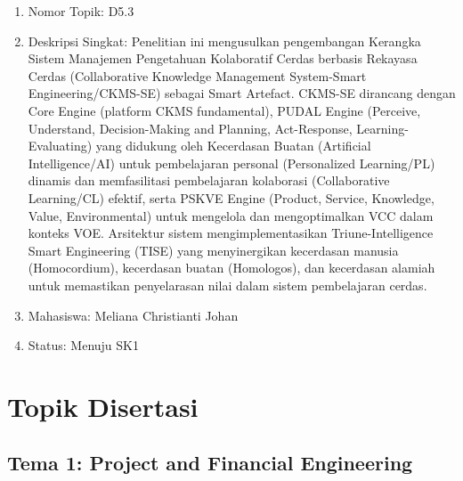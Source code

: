 \documentclass[
  letterpaper,
  DIV=11,
  numbers=noendperiod]{scrreprt}
\providecommand{\tightlist}{%
  \setlength{\itemsep}{0pt}\setlength{\parskip}{0pt}}
\begin{document}
\begin{enumerate}
  \begin{enumerate}
  \def\labelenumii{\arabic{enumii}.}
  \tightlist
  \item
    Nomor Topik: D5.3
  \item
    Deskripsi Singkat: Penelitian ini mengusulkan pengembangan Kerangka
    Sistem Manajemen Pengetahuan Kolaboratif Cerdas berbasis Rekayasa
    Cerdas (Collaborative Knowledge Management System-Smart
    Engineering/CKMS-SE) sebagai Smart Artefact. CKMS-SE dirancang
    dengan Core Engine (platform CKMS fundamental), PUDAL Engine
    (Perceive, Understand, Decision-Making and Planning, Act-Response,
    Learning-Evaluating) yang didukung oleh Kecerdasan Buatan
    (Artificial Intelligence/AI) untuk pembelajaran personal
    (Personalized Learning/PL) dinamis dan memfasilitasi pembelajaran
    kolaborasi (Collaborative Learning/CL) efektif, serta PSKVE Engine
    (Product, Service, Knowledge, Value, Environmental) untuk mengelola
    dan mengoptimalkan VCC dalam konteks VOE. Arsitektur sistem
    mengimplementasikan Triune-Intelligence Smart Engineering (TISE)
    yang menyinergikan kecerdasan manusia (Homocordium), kecerdasan
    buatan (Homologos), dan kecerdasan alamiah untuk memastikan
    penyelarasan nilai dalam sistem pembelajaran cerdas.
  \item
    Mahasiswa: Meliana Christianti Johan
  \item
    Status: Menuju SK1
  \end{enumerate}
\end{enumerate}


\chapter{Topik Disertasi}\label{topik-disertasi}

\section{Tema 1: Project and Financial
Engineering}\label{tema-1-project-and-financial-engineering-1}
\end{document}
